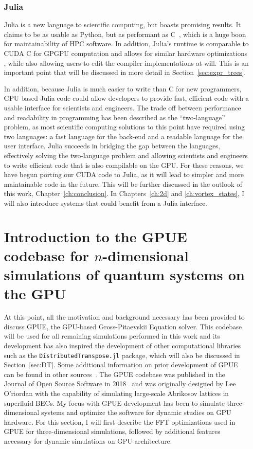\subsubsection{Julia}
Julia is a new language to scientific computing, but boasts promising results.
It claims to be as usable as Python, but as performant as C~\cite{bezanson2017}, which is a huge boon for maintainability of HPC software.
In addition, Julia's runtime is comparable to CUDA C for GPGPU computation and allows for similar hardware optimizations \cite{besard2016, besard2018}, while also allowing users to edit the compiler implementations at will.
This is an important point that will be discussed in more detail in Section~\ref{sec:expr_trees}.

In addition, because Julia is much easier to write than C for new programmers, GPU-based Julia code could allow developers to provide fast, efficient code with a usable interface for scientists and engineers.
The trade off between performance and readability in programming has been described as the ``two-language'' problem, as most scientific computing solutions to this point have required using two languages: a fast language for the back-end and a readable language for the user interface.
Julia succeeds in bridging the gap between the languages, effectively solving the two-language problem and allowing scientists and engineers to write efficient code that is also compilable on the GPU.
For these reasons, we have begun porting our CUDA code to Julia, as it will lead to simpler and more maintainable code in the future.
This will be further discussed in the outlook of this work, Chapter~\ref{ch:conclusion}.
In Chapters~\ref{ch:2d} and \ref{ch:vortex_states}, I will also introduce systems that could benefit from a Julia interface.

\section{Introduction to the GPUE codebase for $n$-dimensional simulations of quantum systems on the GPU}
\label{sec:GPUE}

At this point, all the motivation and background necessary has been provided to discuss GPUE, the GPU-based Gross-Pitaevskii Equation solver.
This codebase will be used for all remaining simulations performed in this work and its development has also inspired the development of other computational libraries such as the \texttt{DistributedTranspose.jl} package, which will also be discussed in Section~\ref{sec:DT}.
Some additional information on prior development of GPUE can be found in other sources~\cite{o2017}.
The GPUE codebase was published in the Journal of Open Source Software in 2018~\cite{schloss2018} and
was originally designed by Lee O'riordan with the capability of simulating large-scale Abrikosov lattices in superfluid BECs.
My focus with GPUE development has been to simulate three-dimensional systems and optimize the software for dynamic studies on GPU hardware.
For this section, I will first describe the FFT optimizations used in GPUE for three-dimensional simulations, followed by additional features necessary for dynamic simulations on GPU architecture.

